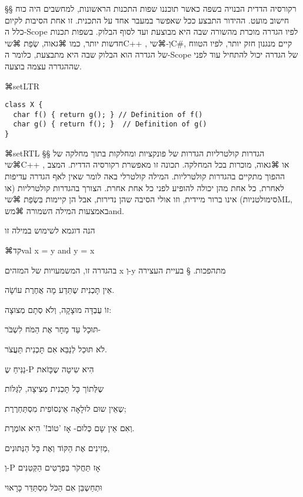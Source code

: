 {§§ רקורסיה הדדית הבנויה בשפה
כאשר תוכננו שפות התכנות הראשונות, למחשבים היה כוח חישוב מועט. ההידור התבצע ככל שאפשר במעבר אחד על התכנית. זו אחת הסיבות לקיום כלל ה-Scope לפיו הגדרה מוכרת מהשורה שבה היא מבוצעת ועד לסוף הבלוק. בשפות תכנות חדשות יותר, כמו ⌘גאוה, שְׂפַת ⌘שי{C++} , וְ-⌘שי{C\#}, קיים מנגנון חזק יותר, לפיו הטווח של הגדרה הוא הבלוק שבה היא מתבצעת, כלומר ה-Scope של הגדרה יכול להתחיל עוד לפני שההגדרה עצמה בוצעה.



⌘setLTR{}
\lstset{language=C++}
\begin{lstlisting}[frame=single]
class X {
  char f() { return g(); } // Definition of f()
  char g() { return f(); }  // Definition of g()
}
\end{lstlisting}
⌘setRTL{}
§§ הגדרות קולטרליות
הגדרות של פונקציות ומחלקות בתוך מחלקה של ⌘שי{C++} , או ⌘גאוה, מוכרות בכל המחלקה. תכונה זו מאפשרת רקורסיה הדדית. המצב ההפוך מתקיים בהגדרות קולטרליות. המילה קולטרלי באה לומר שאין לאף הגדרה עדיפות לאחרת, כל אחת מהן יכולה להופיע לפני כל אחת אחרת. הצורך בהגדרות קולטרליות (או סימולטניות) אינו ברור מיידית, וזו אולי הסיבה שהן נדירות, אבל הן קיימות בִּשְׂפַת ⌘שי{ML}, באמצעות המילה השמורה ⌘מש{and}.

הנה דוגמא לשימוש במילה זו
\begin{center}
⌘קד{val x = y and y = x}
\end{center}

בהגדרה זו, המשמעויות של המזהים x וְ-y מתהפכות.
§ בעיית העצירה

\leavevmode
\newline
אֵין תָּכְנִית שֶתֵּדַע מָה אֲחֶרֶת עוֹשָׂה.

זוֹ עֻבְדָּה מוּצָקָה, וְלֹא סְתָם מְצוּצָה:

תּוּכָל עַד מָחָר אֶת הַמֹּח לִשְבֹּר-

לֹא תּוּכַל לְנַבֵּא אִם תָּכְנִית תַּעֲצֹר.
\leavevmode
\newline


נַנִּיחַ שֶ-P הִיא שִיטָה שֶכָּזֹאת

שֶלְּתוֹך כָּל תָּכְנִית מְצִיצָה, לְגַּלּוֹת

שֶאֵין שוּם לוּלָאָה אֵינְסוֹפִית מִסְתַּחְרֶרֶת;

וְאִם אֵין שָם כְּלוּם- אָז 'טוֹב!' הִיא אוֹמֶרֶת.
\leavevmode
\newline


מְזִינִים אֶת הַקּוֹד וְאֶת כָּל הַנְּתוּנִים,

וְ-P אָז תַּחֲקֹר בַּפְּרָטִים הַקְּטַנִּים

וּתְחַשְבֵּן אִם הַכֹּל מִסְתַּדֵּר כָּרָאוּי

}
